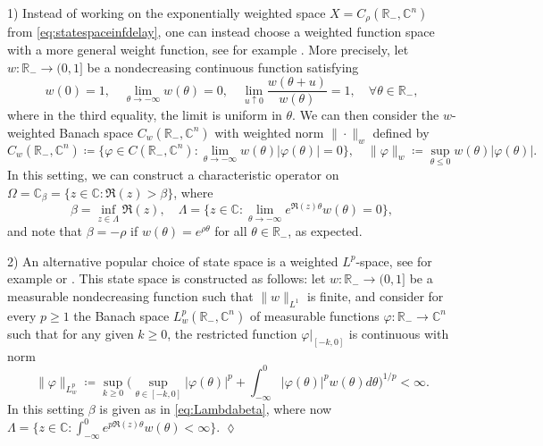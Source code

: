 \documentclass[english]{myarticle}
\begin{document}
\begin{sloppypar}
\begin{remark}
1) Instead of working on the exponentially weighted space $X =  C_\rho(\mathbb{R}_{-}, \mathbb{C}^n)$ from \eqref{eq:statespaceinfdelay}, one can instead choose a weighted function space with a more general weight function, see for example \cite[Section 2]{Faria2002}. More precisely, let $w : \mathbb{R}_{-} \to (0,1]$ be a nondecreasing continuous function satisfying
\begin{equation*}
    w(0) = 1, \quad \lim_{\theta \to -\infty} w(\theta) = 0, \quad \lim_{u \uparrow 0} \frac{w(\theta+u)}{w(\theta)} = 1, \quad \forall \theta \in \mathbb{R}_{-},
\end{equation*}
where in the third equality, the limit is uniform in $\theta$. We can then consider the $w$-weighted Banach space $C_w(\mathbb{R}_{-},\mathbb{C}^n)$ with weighted norm $\| \cdot \|_w$ defined by
\begin{equation*}
    C_w(\mathbb{R}_{-},\mathbb{C}^n) \coloneqq \{ \varphi \in C(\mathbb{R}_-, \mathbb{C}^n) : \lim_{\theta \to -\infty} w(\theta) | \varphi(\theta) | = 0\}, \quad \| \varphi \|_w \coloneqq \sup_{\theta \leq 0} w(\theta) | \varphi(\theta) |.
\end{equation*}
In this setting, we can construct a characteristic operator on $\Omega = \mathbb{C}_\beta = \{ z \in \mathbb{C} : \Re(z) > \beta\}$, where
\begin{equation} \label{eq:Lambdabeta}
    \beta = \inf_{z \in \Lambda} \Re(z), \quad \Lambda = \bigg \{ z \in \mathbb{C} : \lim_{\theta \to - \infty} e^{\Re(z) \theta}  w(\theta) = 0 \bigg\},
\end{equation}
and note that $\beta = - \rho$ if $w(\theta) = e^{\rho \theta}$ for all $\theta \in \mathbb{R}_{-}$, as expected.

2) An alternative popular choice of state space is a weighted $L^p$-space, see for example \cite[Section II.1.3]{Kaashoek1992} or \cite[Section 1]{Naito1976}. This state space is constructed as follows: let $w : \mathbb{R}_{-} \to (0,1]$ be a measurable nondecreasing function such that $\| w \|_{L^1}$ is finite, and consider for every $p \geq 1$ the Banach space $L_w^p(\mathbb{R}_{-},\mathbb{C}^n)$ of measurable functions $\varphi: \mathbb{R}_{-} \to \mathbb{C}^n$ such that for any given $k \geq 0$, the restricted function $\varphi |_{[-k,0]}$ is continuous with norm
\begin{equation*}
    \| \varphi \|_{L_w^p} \coloneqq \sup_{k \geq 0} \bigg( \sup_{\theta \in [-k,0]} | \varphi(\theta) |^p + \int_{-\infty}^0 | \varphi(\theta) |^p w(\theta) d\theta  \bigg)^{1/p} < \infty.
\end{equation*}
In this setting $\beta$ is given as in \eqref{eq:Lambdabeta}, where now $\Lambda = \{ z \in \mathbb{C} : \int_{-\infty}^0 e^{p\Re(z)\theta} w(\theta) < \infty \}.$ \hfill $\lozenge$
\end{remark}


\end{sloppypar}
\end{document}
